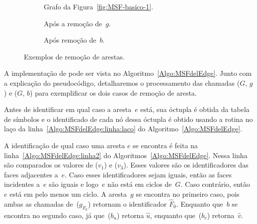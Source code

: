 \begin{figure}[htb]
\begin{subfigure}{0.3\textwidth}
\scalebox{0.7}{

}
\caption{Grafo da Figura~\ref{fig:MSF-basico-1}.}
\label{fig:MSF-basico-reprodicao}
\end{subfigure}
\begin{subfigure}{0.3\textwidth}
\scalebox{0.7}{

}
\caption{Após a remoção de~$g$.}
\label{fig:MSF-remove-ponte}
\end{subfigure}
\begin{subfigure}{0.3\textwidth}
\scalebox{0.7}{

}
\caption{Após remoção de~$b$.}
\label{fig:MSF-remove-nao-ponte}
\end{subfigure}
\caption{Exemplos de remoção de arestas.}
\label{fig:antes-depois-remocao}
\end{figure}


A implementação de \MSFdelEdge{} pode ser vista no Algoritmo~\ref{Algo:MSFdelEdge}.
Junto com a explicação do pseudocódigo, detalharemos o processamento das chamadas \MSFdelEdge($G$, $g$) e \MSFdelEdge($G$, $b$) para exemplificar os dois casos de remoção de aresta.

Antes de identificar em qual caso a aresta~$e$ está, sua óctupla é obtida da tabela de símbolos e o identificado de cada nó dessa óctupla é obtido usando a rotina \LCOFindNode{} no laço da linha~\ref{Algo:MSFdelEdge:linha:laco} do Algoritmo~\ref{Algo:MSFdelEdge}.

A identificação de qual caso uma aresta $e$ se encontra é feita na linha~\ref{Algo:MSFdelEdge:linha2} do Algoritmos~\ref{Algo:MSFdelEdge}.
Nessa linha são comparados os valores de \LCOFindNode($v_1$) e \LCOFindNode($v_3$).
Esses valores são os identificadores das faces adjacentes a~$e$.
Caso esses identificadores sejam iguais, então as faces incidentes a~$e$ são iguais e logo~$e$ não está em ciclos de~$G$.
Caso contrário, então~$e$ está em pelo menos um ciclo.
A aresta~$g$ se encontra no primeiro caso, pois ambas as chamadas de~\LCOFindNode($g_{F_0}$) retornam o identificador $\hat F_0$.
Enquanto que~$b$ se encontra no segundo caso, já que~\LCOFindNode($b_u$) retorna $\hat u$, enquanto que~\LCOFindNode($b_v$) retorna~$\hat v$.

